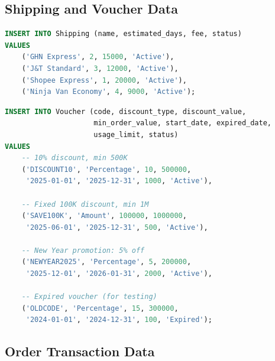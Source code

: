\subsection{Shipping and Voucher Data}

\begin{lstlisting}[language=SQL, caption=Sample SHIPPING Insert, label=lst:insert_shipping]
INSERT INTO Shipping (name, estimated_days, fee, status)
VALUES
    ('GHN Express', 2, 15000, 'Active'),
    ('J&T Standard', 3, 12000, 'Active'),
    ('Shopee Express', 1, 20000, 'Active'),
    ('Ninja Van Economy', 4, 9000, 'Active');
\end{lstlisting}

\begin{lstlisting}[language=SQL, caption=Sample VOUCHER Insert, label=lst:insert_voucher]
INSERT INTO Voucher (code, discount_type, discount_value, 
                     min_order_value, start_date, expired_date, 
                     usage_limit, status)
VALUES
    -- 10% discount, min 500K
    ('DISCOUNT10', 'Percentage', 10, 500000,
     '2025-01-01', '2025-12-31', 1000, 'Active'),
    
    -- Fixed 100K discount, min 1M
    ('SAVE100K', 'Amount', 100000, 1000000,
     '2025-06-01', '2025-12-31', 500, 'Active'),
    
    -- New Year promotion: 5% off
    ('NEWYEAR2025', 'Percentage', 5, 200000,
     '2025-12-01', '2026-01-31', 2000, 'Active'),
    
    -- Expired voucher (for testing)
    ('OLDCODE', 'Percentage', 15, 300000,
     '2024-01-01', '2024-12-31', 100, 'Expired');
\end{lstlisting}

\subsection{Order Transaction Data}

